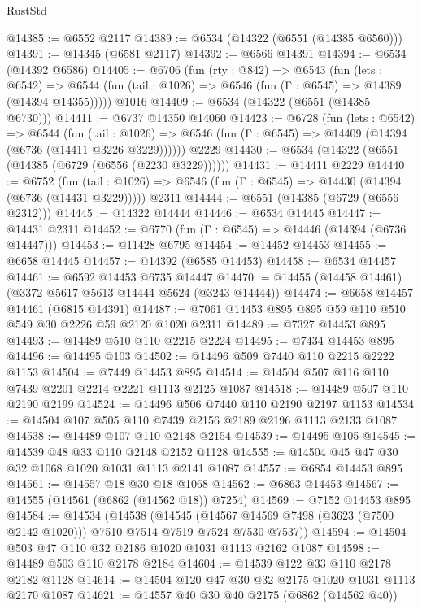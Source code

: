 \begin{lexlean}{RustStd}
\begin{coremodule}
@14385 := @6552 @2117
@14389 := @6534 (@14322 (@6551 (@14385 @6560)))
@14391 := @14345 (@6581 @2117)
@14392 := @6566 @14391
@14394 := @6534 (@14392 @6586)
@14405 := @6706
    (fun (rty : @842) =>
    @6543
      (fun (lets : @6542) =>
      @6544 (fun (tail : @1026) => @6546 (fun (Γ : @6545) => @14389 (@14394 @14355)))))
    @1016
@14409 := @6534 (@14322 (@6551 (@14385 @6730)))
@14411 := @6737 @14350 @14060
@14423 := @6728
    (fun (lets : @6542) =>
    @6544
      (fun (tail : @1026) =>
      @6546 (fun (Γ : @6545) => @14409 (@14394 (@6736 (@14411 @3226 @3229))))))
    @2229
@14430 := @6534 (@14322 (@6551 (@14385 (@6729 (@6556 (@2230 @3229))))))
@14431 := @14411 @2229
@14440 := @6752
    (fun (tail : @1026) => @6546 (fun (Γ : @6545) => @14430 (@14394 (@6736 (@14431 @3229)))))
    @2311
@14444 := @6551 (@14385 (@6729 (@6556 @2312)))
@14445 := @14322 @14444
@14446 := @6534 @14445
@14447 := @14431 @2311
@14452 := @6770 (fun (Γ : @6545) => @14446 (@14394 (@6736 @14447)))
@14453 := @11428 @6795
@14454 := @14452 @14453
@14455 := @6658 @14445
@14457 := @14392 (@6585 @14453)
@14458 := @6534 @14457
@14461 := @6592 @14453 @6735 @14447
@14470 := @14455 (@14458 @14461) (@3372 @5617 @5613 @14444 @5624 (@3243 @14444))
@14474 := @6658 @14457 @14461 (@6815 @14391)
@14487 := @7061 @14453 @895 @895 @59 @110 @510 @549 @30 @2226 @59 @2120 @1020 @2311
@14489 := @7327 @14453 @895
@14493 := @14489 @510 @110 @2215 @2224
@14495 := @7434 @14453 @895
@14496 := @14495 @103
@14502 := @14496 @509 @7440 @110 @2215 @2222 @1153
@14504 := @7449 @14453 @895
@14514 := @14504 @507 @116 @110 @7439 @2201 @2214 @2221 @1113 @2125 @1087
@14518 := @14489 @507 @110 @2190 @2199
@14524 := @14496 @506 @7440 @110 @2190 @2197 @1153
@14534 := @14504 @107 @505 @110 @7439 @2156 @2189 @2196 @1113 @2133 @1087
@14538 := @14489 @107 @110 @2148 @2154
@14539 := @14495 @105
@14545 := @14539 @48 @33 @110 @2148 @2152 @1128
@14555 := @14504 @45 @47 @30 @32 @1068 @1020 @1031 @1113 @2141 @1087
@14557 := @6854 @14453 @895
@14561 := @14557 @18 @30 @18 @1068
@14562 := @6863 @14453
@14567 := @14555 (@14561 (@6862 (@14562 @18)) @7254)
@14569 := @7152 @14453 @895
@14584 := @14534
    (@14538
      (@14545
        (@14567 @14569 @7498 (@3623 (@7500 @2142 @1020)))
        @7510
        @7514
        @7519
        @7524
        @7530
        @7537))
@14594 := @14504 @503 @47 @110 @32 @2186 @1020 @1031 @1113 @2162 @1087
@14598 := @14489 @503 @110 @2178 @2184
@14604 := @14539 @122 @33 @110 @2178 @2182 @1128
@14614 := @14504 @120 @47 @30 @32 @2175 @1020 @1031 @1113 @2170 @1087
@14621 := @14557 @40 @30 @40 @2175 (@6862 (@14562 @40))

\end{coremodule}
\end{lexlean}
